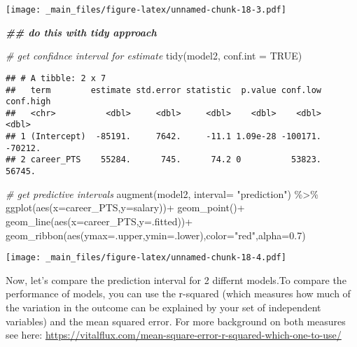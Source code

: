 \documentclass[
]{book}
\newenvironment{Shaded}{\begin{snugshade}}{\end{snugshade}}
\newcommand{\AttributeTok}[1]{\textcolor[rgb]{0.77,0.63,0.00}{#1}}
\newcommand{\CommentTok}[1]{\textcolor[rgb]{0.56,0.35,0.01}{\textit{#1}}}
\newcommand{\ConstantTok}[1]{\textcolor[rgb]{0.00,0.00,0.00}{#1}}
\newcommand{\DocumentationTok}[1]{\textcolor[rgb]{0.56,0.35,0.01}{\textbf{\textit{#1}}}}
\newcommand{\FloatTok}[1]{\textcolor[rgb]{0.00,0.00,0.81}{#1}}
\newcommand{\FunctionTok}[1]{\textcolor[rgb]{0.00,0.00,0.00}{#1}}
\newcommand{\NormalTok}[1]{#1}
\newcommand{\SpecialCharTok}[1]{\textcolor[rgb]{0.00,0.00,0.00}{#1}}
\newcommand{\StringTok}[1]{\textcolor[rgb]{0.31,0.60,0.02}{#1}}
\begin{document}
\texttt{[image: \_main\_files/figure-latex/unnamed-chunk-18-3.pdf]}

\begin{Shaded}
\begin{Highlighting}[]
\DocumentationTok{\#\# do this with tidy approach}

\CommentTok{\# get confidnce interval for estimate}
\FunctionTok{tidy}\NormalTok{(model2, }\AttributeTok{conf.int =} \ConstantTok{TRUE}\NormalTok{)}
\end{Highlighting}
\end{Shaded}

\begin{verbatim}
## # A tibble: 2 x 7
##   term        estimate std.error statistic  p.value conf.low conf.high
##   <chr>          <dbl>     <dbl>     <dbl>    <dbl>    <dbl>     <dbl>
## 1 (Intercept)  -85191.     7642.     -11.1 1.09e-28 -100171.   -70212.
## 2 career_PTS    55284.      745.      74.2 0          53823.    56745.
\end{verbatim}

\begin{Shaded}
\begin{Highlighting}[]
\CommentTok{\# get predictive intervals}
\FunctionTok{augment}\NormalTok{(model2, }\AttributeTok{interval=} \StringTok{"prediction"}\NormalTok{) }\SpecialCharTok{\%\textgreater{}\%}
  \FunctionTok{ggplot}\NormalTok{(}\FunctionTok{aes}\NormalTok{(}\AttributeTok{x=}\NormalTok{career\_PTS,}\AttributeTok{y=}\NormalTok{salary))}\SpecialCharTok{+}
  \FunctionTok{geom\_point}\NormalTok{()}\SpecialCharTok{+}
  \FunctionTok{geom\_line}\NormalTok{(}\FunctionTok{aes}\NormalTok{(}\AttributeTok{x=}\NormalTok{career\_PTS,}\AttributeTok{y=}\NormalTok{.fitted))}\SpecialCharTok{+}
  \FunctionTok{geom\_ribbon}\NormalTok{(}\FunctionTok{aes}\NormalTok{(}\AttributeTok{ymax=}\NormalTok{.upper,}\AttributeTok{ymin=}\NormalTok{.lower),}\AttributeTok{color=}\StringTok{"red"}\NormalTok{,}\AttributeTok{alpha=}\FloatTok{0.7}\NormalTok{)}
\end{Highlighting}
\end{Shaded}

\texttt{[image: \_main\_files/figure-latex/unnamed-chunk-18-4.pdf]}

Now, let's compare the prediction interval for 2 differnt models.To compare the performance of models, you can use the r-squared (which measures how much of the variation in the outcome can be explained by your set of independent variables) and the mean squared error. For more background on both measures see here: \url{https://vitalflux.com/mean-square-error-r-squared-which-one-to-use/}
\end{document}
